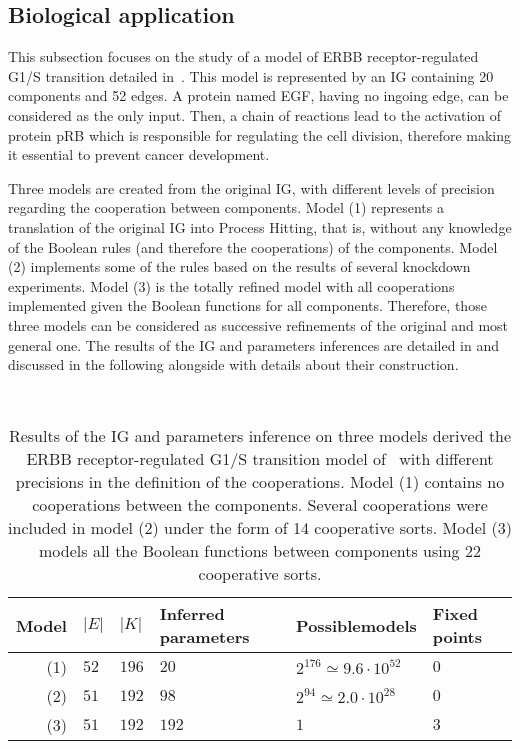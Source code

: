\subsection{Biological application}\label{ssec:appli}

This subsection focuses on the study of a model of ERBB receptor-regulated G1/S transition detailed in~\cite{Sahin09}.
This model is represented by an IG containing 20 components and 52 edges.
A protein named EGF, having no ingoing edge, can be considered as the only input.
Then, a chain of reactions lead to the activation of protein pRB which is responsible for regulating the cell division,
therefore making it essential to prevent cancer development.

Three models are created from the original IG, with different levels of precision regarding the cooperation between components.
Model (1) represents a translation of the original IG into Process Hitting, that is,
without any knowledge of the Boolean rules (and therefore the cooperations) of the components.
Model (2) implements some of the rules based on the results of several knockdown experiments.
Model (3) is the totally refined model with all cooperations implemented given the Boolean functions for all components.
Therefore, those three models can be considered as successive refinements of the original and most general one.
The results of the IG and parameters inferences are detailed in 
and discussed in the following alongside with details about their construction.

\begin{table}[ht]
~\hfill%
  \begin{tabular}{r|l|l|m{2cm}|m{2.5cm}|m{1.5cm}}
    \textbf{Model} & \textbf{$|E|$} & \textbf{$|K|$} & \textbf{Inferred parameters} & \textbf{Possible\newline models} & \textbf{Fixed points}
  \\\hline\hline
    (1) & $52$ & $196$ & $20$ & $2^{176}\simeq 9.6\cdot10^{52}$ & $0$   %
  \\\hline
    (2) & $51$ & $192$ & $98$ & $2^{94}\simeq 2.0\cdot10^{28}$ & $0$    %
  \\\hline
    (3) & $51$ & $192$ & $192$ & $1$ & $3$                              %
  \\\hline
  \end{tabular}
\hfill~%
  \caption{Results of the IG and parameters inference on three models
  derived the ERBB receptor-regulated G1/S transition model of~\cite{Sahin09}
  with different precisions in the definition of the cooperations.
  Model (1) contains no cooperations between the components.
  Several cooperations were included in model (2) under the form of 14 cooperative sorts.
  Model (3) models all the Boolean functions between components using 22 cooperative sorts.}
  \label{tb:egfr20}
\end{table}

